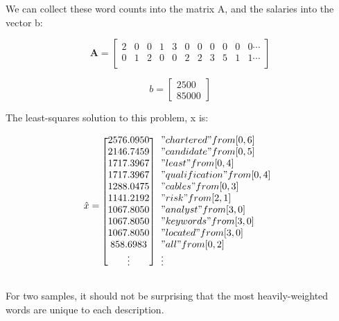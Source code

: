 \documentclass[12pt]{article}
\begin{document}
    We can collect these word counts into the matrix A, and the salaries into
    the vector b:


    \begin{equation*}
        \bm{A} = 
        \begin{bmatrix}
            2 &	0 &	0 &	1 &	3 &	0 &	0 &	0 &	0 &	0 &	0 \cdots \\
            0 &	1 &	2 &	0 &	0 &	2 &	2 &	3 &	5 &	1 &	1 \cdots \\
        \end{bmatrix}
    \end{equation*}


    \begin{equation*}
        b = 
        \begin{bmatrix}
        2500\\
        85000
        \end{bmatrix}
    \end{equation*}

    \noindent The least-squares solution to this problem, x is:


    \begin{equation*}
        \hat{x} = 
        \begin{blockarray}{[c] l}
            2576.0950 & "chartered" from [0, 6] \\ 
            2146.7459 & "candidate" from [0, 5] \\ 
            1717.3967 & "least" from [0, 4] \\ 
            1717.3967 & "qualification" from [0, 4] \\ 
            1288.0475 & "cables" from [0, 3] \\ 
            1141.2192 & "risk" from [2, 1] \\ 
            1067.8050 & "analyst" from [3, 0] \\ 
            1067.8050 & "keywords" from [3, 0] \\ 
            1067.8050 & "located" from [3, 0] \\ 
            858.6983 & "all" from [0, 2] \\ 
        \vdots & \vdots
        \end{blockarray}
    \end{equation*}

    For two samples, it should not be surprising that the most heavily-weighted
    words are unique to each description.
\end{document}
